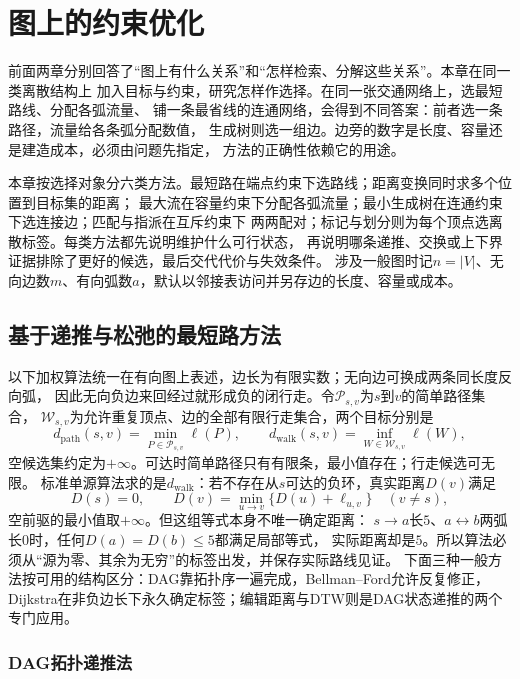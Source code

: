\chapter{图上的约束优化}
\label{chap:graph-optimization}

前面两章分别回答了“图上有什么关系”和“怎样检索、分解这些关系”。本章在同一类离散结构上
加入目标与约束，研究怎样作选择。在同一张交通网络上，选最短路线、分配各弧流量、
铺一条最省线的连通网络，会得到不同答案：前者选一条路径，流量给各条弧分配数值，
生成树则选一组边。边旁的数字是长度、容量还是建造成本，必须由问题先指定，
方法的正确性依赖它的用途。

本章按选择对象分六类方法。最短路在端点约束下选路线；距离变换同时求多个位置到目标集的距离；
最大流在容量约束下分配各弧流量；最小生成树在连通约束下选连接边；匹配与指派在互斥约束下
两两配对；标记与划分则为每个顶点选离散标签。每类方法都先说明维护什么可行状态，
再说明哪条递推、交换或上下界证据排除了更好的候选，最后交代代价与失效条件。
涉及一般图时记$n=|V|$、无向边数$m$、有向弧数$a$，默认以邻接表访问并另存边的长度、容量或成本。

\section{基于递推与松弛的最短路方法}

以下加权算法统一在有向图上表述，边长为有限实数；无向边可换成两条同长度反向弧，
因此无向负边来回经过就形成负的闭行走。令$\mathcal P_{s,v}$为$s$到$v$的简单路径集合，
$\mathcal W_{s,v}$为允许重复顶点、边的全部有限行走集合，两个目标分别是
\[
  d_{\mathrm{path}}(s,v)=\min_{P\in\mathcal P_{s,v}}\ell(P),\qquad
  d_{\mathrm{walk}}(s,v)=\inf_{W\in\mathcal W_{s,v}}\ell(W),
\]
空候选集约定为$+\infty$。可达时简单路径只有有限条，最小值存在；行走候选可无限。
标准单源算法求的是$d_{\mathrm{walk}}$：若不存在从$s$可达的负环，真实距离$D(v)$满足
\begin{equation}
  D(s)=0,\qquad
  D(v)=\min_{u\to v}\{D(u)+\ell_{u,v}\}\quad(v\neq s),
  \label{eq:graph-theory-shortest-path-bellman}
\end{equation}
空前驱的最小值取$+\infty$。但这组等式本身不唯一确定距离：
$s\to a$长$5$、$a\leftrightarrow b$两弧长$0$时，任何$D(a)=D(b)\leq5$都满足局部等式，
实际距离却是$5$。所以算法必须从“源为零、其余为无穷”的标签出发，并保存实际路线见证。
下面三种一般方法按可用的结构区分：DAG靠拓扑序一遍完成，Bellman--Ford允许反复修正，
Dijkstra在非负边长下永久确定标签；编辑距离与DTW则是DAG状态递推的两个专门应用。

\subsection{DAG拓扑递推法}

